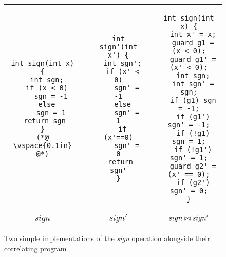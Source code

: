 \begin{figure}
\centering
\begin{tabular}{ccccc}
\begin{lstlisting}
int sign(int x) {
  int sgn;
  if (x < 0)
    sgn = -1
  else
    sgn = 1
 return sgn
}
(*@ \vspace{0.1in} @*)
\end{lstlisting}
&
\hspace{0.35in}
&
\begin{lstlisting}
int sign'(int x') {
  int sgn';
  if (x' < 0)
    sgn' = -1
  else
    sgn' = 1
  if (x'==0)
    sgn' = 0
 return sgn'
}
\end{lstlisting}
&
\hspace{0.35in}
&
\begin{lstlisting}
int sign(int x) {
  int x' = x;
  guard g1 = (x < 0);
  guard g1' = (x' < 0);
  int sgn;
  int sgn' = sgn;
  if (g1) sgn = -1;
  if (g1') sgn' = -1;
  if (!g1) sgn = 1;
  if (!g1') sgn' = 1;
  guard g2' = (x' == 0);
  if (g2') sgn' = 0;
}
\end{lstlisting}
\\ 
$sign$
&
&
$sign'$
&
&
$sign \bowtie sign'$
\end{tabular}
\caption{Two simple implementations of the \emph{sign} operation alongside their correlating program}
\end{figure}

